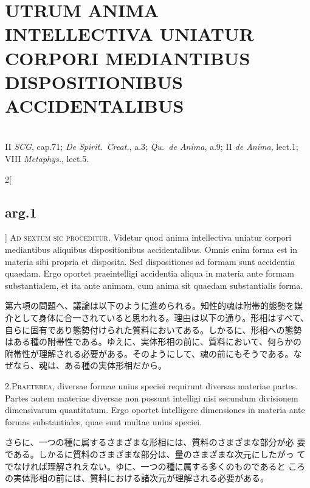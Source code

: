 \documentclass[paper=a4paper,fontsize=10pt,jafontsize=9pt,titlepage]{jlreq}
\begin{document}
\section{UTRUM ANIMA INTELLECTIVA UNIATUR CORPORI MEDIANTIBUS DISPOSITIONIBUS ACCIDENTALIBUS}
\vspace{1em}
\\
{\footnotesize II {\itshape SCG}, cap.71; {\itshape De Spirit.~Creat.}, a.3; {\itshape Qu.~de Anima}, a.9; II {\itshape de Anima}, lect.1; VIII {\itshape Metaphys.}, lect.5.}\\
\begin{paracol}{2}[\subsection{arg.1}]
{\scshape Ad sextum sic proceditur}. Videtur quod anima intellectiva
uniatur corpori mediantibus aliquibus dispositionibus
accidentalibus. Omnis enim forma est in materia sibi propria et
disposita. Sed dispositiones ad formam sunt accidentia quaedam. Ergo
oportet praeintelligi accidentia aliqua in materia ante formam
substantialem, et ita ante animam, cum anima sit quaedam substantialis
forma.

\switchcolumn

第六項の問題へ、議論は以下のように進められる。知性的魂は附帯的態勢を媒
介として身体に合一されていると思われる。理由は以下の通り。形相はすべて、
自らに固有であり態勢付けられた質料においてある。しかるに、形相への態勢
はある種の附帯性である。ゆえに、実体形相の前に、質料において、何らかの
附帯性が理解される必要がある。そのようにして、魂の前にもそうである。な
ぜなら、魂は、ある種の実体形相だから。
 



2.{\scshape Praeterea}, diversae formae unius speciei requirunt
diversas materiae partes. Partes autem materiae diversae non possunt
intelligi nisi secundum divisionem dimensivarum quantitatum. Ergo
oportet intelligere dimensiones in materia ante formas substantiales,
quae sunt multae unius speciei.

\switchcolumn

 さらに、一つの種に属するさまざまな形相には、質料のさまざまな部分が必
 要である。しかるに質料のさまざまな部分は、量のさまざまな次元にしたがっ
 てでなければ理解されえない。ゆに、一つの種に属する多くのものであると
 ころの実体形相の前には、質料における諸次元が理解される必要がある。
 

\end{paracol}
\end{document}
